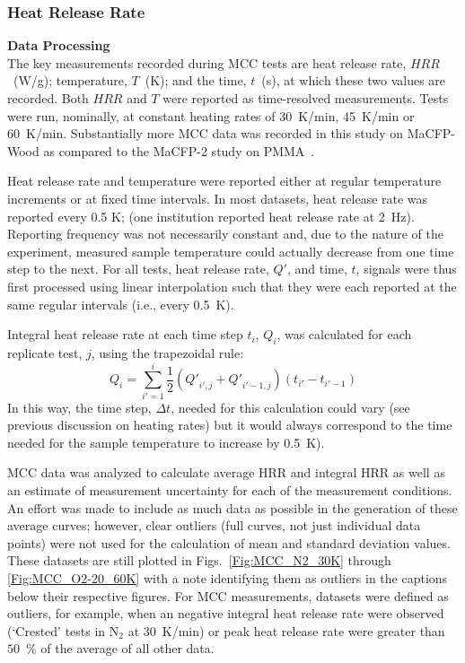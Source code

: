 \documentclass{book}
\begin{document}
\subsubsection{Heat Release Rate}

\textbf{Data Processing}\\
The key measurements recorded during MCC tests are heat release rate, $HRR$~(W/g); temperature, $T$~(K); and the time, $t$~(s), at which these two values are recorded. Both $HRR$ and $T$ were reported as time-resolved measurements. Tests were run, nominally, at constant heating rates of 30~K/min, 45~K/min or 60~K/min. Substantially more MCC data was recorded in this study on MaCFP-Wood as compared to the MaCFP-2 study on PMMA~\cite{PreliminarySummary}.

Heat release rate and temperature were reported either at regular temperature increments or at fixed time intervals. In most datasets, heat release rate was reported every 0.5 K; (one institution reported heat release rate at 2~Hz). Reporting frequency was not necessarily constant and, due to the nature of the experiment, measured sample temperature could actually decrease from one time step to the next. For all tests, heat release rate, $Q'$, and time, $t$, signals were thus first processed using linear interpolation such that they were each reported at the same regular intervals (i.e., every 0.5~K).

Integral heat release rate at each time step $t_i$, $Q_i$, was calculated for each replicate test, $j$, using the trapezoidal rule:
\begin{equation}
	Q_i = \sum_{i'=1}^i \frac{1}{2} \left( {Q'}_{i',j} + {Q'}_{i'-1,j} \right) \left(t_{i'}-t_{i'-1} \right)
\end{equation}
In this way, the time step, $\Delta t$, needed for this calculation could vary (see previous discussion on heating rates) but it would always correspond to the time needed for the sample temperature to increase by 0.5~K).

MCC data was analyzed to calculate average HRR and integral HRR as well as an estimate of measurement uncertainty for each of the measurement conditions. An effort was made to include as much data as possible in the generation of these average curves; however, clear outliers (full curves, not just individual data points) were not used for the calculation of mean and standard deviation values. These datasets are still plotted in Figs.~\ref{Fig:MCC_N2_30K} through \ref{Fig:MCC_O2-20_60K} with a note identifying them as outliers in the captions below their respective figures. For MCC measurements, datasets were defined as outliers, for example, when an negative integral heat release rate were observed (‘Crested’ tests in N$_2$ at 30~K/min) or peak heat release rate were greater than $50$~\% of the average of all other data.
\end{document}
